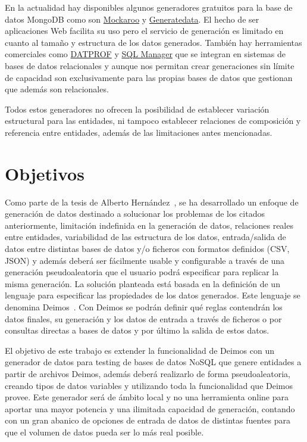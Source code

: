 En la actualidad hay disponibles algunos generadores gratuitos para la base de datos MongoDB como son \href{https://mockaroo.com}{Mockaroo} y \href{https://generatedata.com}{Generatedata}. El hecho de ser aplicaciones Web facilita su uso pero el servicio de generación es limitado en cuanto al tamaño y estructura de los datos generados. También hay herramientas comerciales como \href{https://datprof.com}{DATPROF} y \href{https://sqlmanager.net}{SQL Manager} que se integran en sistemas de bases de datos relacionales y aunque nos permitan crear generaciones sin límite de capacidad son exclusivamente para las propias bases de datos que gestionan que además son relacionales.

Todos estos generadores no ofrecen la posibilidad de establecer variación estructural para las entidades, ni tampoco establecer relaciones de composición y referencia entre entidades, además de las limitaciones antes mencionadas.

\section{Objetivos}

Como parte de la tesis de Alberto Hernández~\cite{deimosAlberto}, se ha desarrollado un enfoque de generación de datos destinado a solucionar los problemas de los citados anteriormente, limitación indefinida en la generación de datos, relaciones reales entre entidades, variabilidad de las estructura de los datos, entrada/salida de datos entre distintas bases de datos y/o ficheros con formatos definidos (CSV, JSON) y además deberá ser fácilmente usable y configurable a través de una generación pseudoaleatoria que el usuario podrá especificar para replicar la misma generación. La solución planteada está basada en la definición de un lenguaje para especificar las propiedades de los datos generados. Este lenguaje se denomina Deimos~\cite{deimosAlberto}. Con Deimos se podrán definir qué reglas contendrán los datos finales, su generación y los datos de entrada a través de ficheros o por consultas directas a bases de datos y por último la salida de estos datos.

El objetivo de este trabajo es extender la funcionalidad de Deimos con un generador de datos para testing de bases de datos NoSQL que genere entidades a partir de archivos Deimos, además deberá realizarlo de forma pseudoaleatoria, creando tipos de datos variables y utilizando toda la funcionalidad que Deimos provee. Este generador será de ámbito local y no una herramienta online para aportar una mayor potencia y una ilimitada capacidad de generación, contando con un gran abanico de opciones de entrada de datos de distintas fuentes para que el volumen de datos pueda ser lo más real posible.

